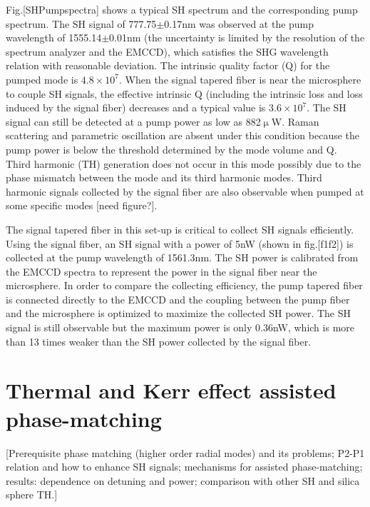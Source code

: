 \documentclass[a4paper,12pt,hyperref]{article}
\begin{document}
Fig.[SHPumpspectra] shows a typical SH spectrum and the corresponding pump spectrum. The SH signal of 777.75$\pm$0.17nm was observed at the pump wavelength of 1555.14$\pm$0.01nm (the uncertainty is limited by the resolution of the spectrum analyzer and the EMCCD), which satisfies the SHG wavelength relation with reasonable deviation. The intrinsic quality factor (Q) for the pumped mode is $4.8\times10^7$. When the signal tapered fiber is near the microsphere to couple SH signals, the effective intrinsic Q (including the intrinsic loss and loss induced by the signal fiber) decreases and a typical value is $3.6\times 10^7$. The SH signal can still be detected at a pump power as low as 882$\upmu $W. Raman scattering and parametric oscillation are absent under this condition because the pump power is below the threshold determined by the mode volume and Q\cite{spillane2002ultralow, kippenberg2004kerr}. Third harmonic (TH) generation does not occur in this mode possibly due to the phase mismatch between the mode and its third harmonic modes\cite{carmon2007visible}. Third harmonic signals  collected by the signal fiber are also observable when pumped at some specific modes [need figure?]. 

The signal tapered fiber in this set-up is critical to collect SH signals efficiently. Using the signal fiber, an SH signal with a power of 5nW (shown in fig.[f1f2]) is collected at the pump wavelength of 1561.3nm. The SH power is calibrated from the EMCCD spectra to represent the power in the signal fiber near the microsphere. In order to compare the collecting efficiency, the pump tapered fiber is connected directly to the EMCCD and the coupling between the pump fiber and the microsphere is optimized to maximize the collected SH power. The SH signal is still observable but the maximum power is only 0.36nW, which is more than 13 times weaker than the SH power collected by the signal fiber.


\section{Thermal and Kerr effect assisted phase-matching}
[Prerequisite phase matching (higher order radial modes) and its problems; P2-P1 relation and how to enhance SH signals; mechanisms for assisted phase-matching; results: dependence on detuning and power; comparison with other SH and silica sphere TH.]
\end{document}
